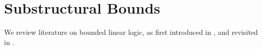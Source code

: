 \chapter{Substructural Bounds}


We review literature on bounded linear logic, as first introduced in
\cite{girard-scedorov-scott-1992}, and revisited in
\cite{dal-lago-hofmann-2010}.
